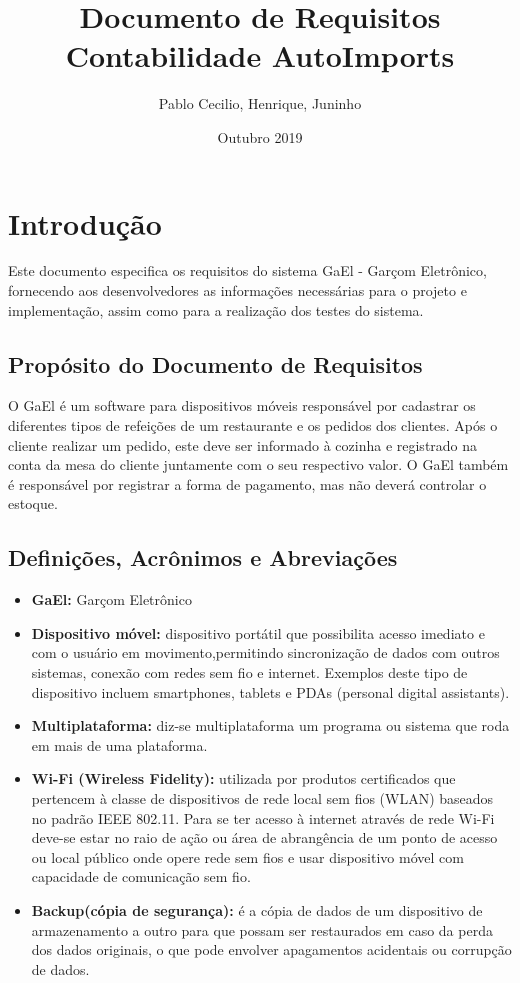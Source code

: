 \documentclass[11pt,a4paper]{article}
\title{Documento de Requisitos\\ Contabilidade AutoImports}
\author{Pablo Cecilio, Henrique, Juninho}
\date{Outubro 2019}
\begin{document}
\maketitle
\tableofcontents

\section{Introdução}

Este documento especifica os requisitos do sistema GaEl - Garçom Eletrônico, fornecendo aos desenvolvedores as informações necessárias para o projeto e implementação, assim como para a realização dos testes do sistema.

\subsection{Propósito do Documento de Requisitos}

O GaEl é um software para dispositivos móveis responsável por cadastrar os diferentes tipos de refeições de um restaurante e os pedidos dos clientes. Após o cliente realizar um pedido, este deve ser informado à cozinha e registrado na conta da mesa do cliente juntamente com o seu respectivo valor. O GaEl também é responsável por registrar a forma de pagamento, mas não deverá controlar o estoque.

\subsection{Definições, Acrônimos e Abreviações}

\begin{itemize}[leftmargin=*]
    \item[] \textbf{GaEl:} Garçom Eletrônico
    \item[] \textbf{Dispositivo móvel:} dispositivo portátil que possibilita acesso imediato e com o usuário em movimento,permitindo sincronização de dados com outros sistemas, conexão com redes sem fio e internet. Exemplos deste tipo de dispositivo incluem smartphones, tablets e PDAs (personal digital assistants).
    \item[] \textbf{Multiplataforma:} diz-se multiplataforma um programa ou sistema que roda em mais de uma plataforma.
    \item[] \textbf{Wi-Fi (Wireless Fidelity):} utilizada por produtos certificados que pertencem à classe de dispositivos de rede local sem fios (WLAN) baseados no padrão IEEE 802.11. Para se ter acesso à internet através de rede Wi-Fi deve-se estar no raio de ação ou área de abrangência de um ponto de acesso ou local público onde opere rede sem fios e usar dispositivo móvel com capacidade de comunicação sem fio.
    \item[] \textbf{Backup(cópia de segurança):} é a cópia de dados de um dispositivo de armazenamento a outro para que possam ser restaurados em caso da perda dos dados originais, o que pode envolver apagamentos acidentais ou corrupção de dados.
\end{itemize}
\end{document}
